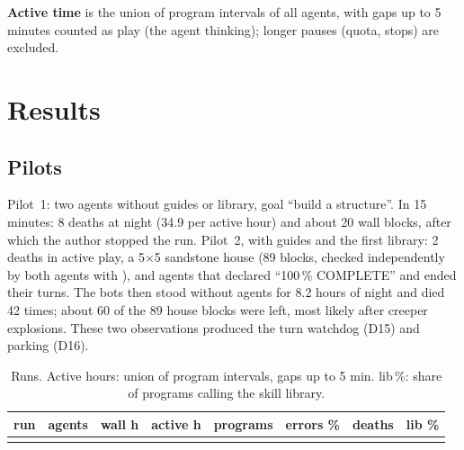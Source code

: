 \documentclass[11pt]{article}
\begin{document}
\textbf{Active time} is the union of program intervals of all agents, with gaps up to 5 minutes counted as play (the agent thinking); longer pauses (quota, stops) are excluded.

\section{Results}
\subsection{Pilots}
Pilot~1: two agents without guides or library, goal ``build a structure''. In 15 minutes: 8 deaths at night (34.9 per active hour) and about 20 wall blocks, after which the author stopped the run. Pilot~2, with guides and the first library: 2 deaths in active play, a 5\(\times\)5 sandstone house (89 blocks, checked independently by both agents with ), and agents that declared ``100\,\% COMPLETE'' and ended their turns. The bots then stood without agents for 8.2 hours of night and died 42 times; about 60 of the 89 house blocks were left, most likely after creeper explosions. These two observations produced the turn watchdog (D15) and parking (D16).

\begin{table}[h]\centering\small
\caption{Runs. Active hours: union of program intervals, gaps up to 5 min. lib\,\%: share of programs calling the skill library.}\label{tab:runs}
\begin{tabularx}{\linewidth}{@{}L rrrrrrr@{}}\toprule
run & agents & wall h & active h & programs & errors \% & deaths & lib \% \\\midrule
{}\bottomrule\end{tabularx}
\end{table}
\end{document}
